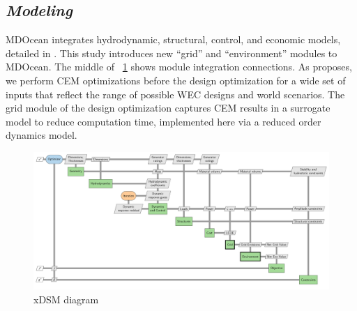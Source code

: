 \documentclass[10pt,twoside]{article}
\newif\ifplaceholder
\let\originalincludegraphics\includegraphics
\renewcommand{\includegraphics}[2][]{%
  \ifplaceholder
    \begin{tikzpicture}
      \node[anchor=south west, inner sep=0] (img) at (0,0) {\originalincludegraphics[#1]{#2}};
      \node at ($(img.south east)!0.5!(img.north west)$)
        [fill=white,opacity=0.8,text=red,font=\huge] {Placeholder};
    \end{tikzpicture}
    \vspace{-\baselineskip}
  \else
    \originalincludegraphics[#1]{#2}%
  \fi
  \placeholderfalse %
}
\begin{document}
\subsection{\textit{Modeling}}
MDOcean integrates hydrodynamic, structural, control, and economic models, detailed in \cite{mccabe_leveraging_2025}.
This study introduces new ``grid'' and ``environment'' modules to MDOcean.
The middle of \figureautorefname~\ref{fig:n2} shows module integration connections.
As \cite{mccabe_system_2023} proposes, we perform CEM optimizations before the design optimization for a wide set of inputs that reflect the range of possible WEC designs and world scenarios. The grid module of the design optimization captures CEM results in a surrogate model to reduce computation time, implemented here via a reduced order dynamics model.
\begin{figure}[hbtp]
    \centering
    \includegraphics[width=.72\textwidth]{figures/out/xdsm_grid.pdf}
    \caption{xDSM diagram}
    \label{fig:n2}
\end{figure}

\clearpage
\end{document}
